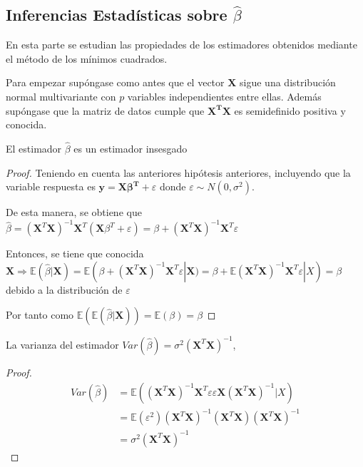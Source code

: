 \subsection*{Inferencias Estadísticas sobre $\hat{\beta}$}

\noindent En esta parte se estudian las propiedades de los estimadores obtenidos mediante el método de los mínimos cuadrados. 

\noindent Para empezar supóngase como antes que el vector $\mathbf{X}$ sigue una distribución normal multivariante con $p$ variables independientes entre ellas. Además supóngase que  la matriz de datos cumple que $\mathbf{X^T X}$ es semidefinido positiva y conocida. 

\begin{propo}
El estimador $\hat{\beta}$ es un estimador insesgado \cite{Greene 2008}
\begin{proof}
Teniendo en cuenta las anteriores hipótesis anteriores, incluyendo que la variable respuesta es $\mathbf{y}=\mathbf{X\beta^T}+\varepsilon$ donde $\varepsilon \sim N(0,\sigma^2)$. 

\noindent De esta manera, se obtiene que $\hat{\beta}=(\mathbf{X}^T\mathbf{X})^{-1}\mathbf{X}^T(\mathbf{X}\beta^T+\varepsilon)=\beta+(\mathbf{X}^T\mathbf{X})^{-1}\mathbf{X}^T \varepsilon$

\noindent Entonces, se tiene que conocida $\mathbf{X} \Rightarrow \mathbb{E}(\hat{\beta}|\mathbf{X})=\mathbb{E}(\beta+(\mathbf{X}^T\mathbf{X})^{-1}\mathbf{X}^T \varepsilon|\mathbf{X})=\beta +\mathbb{E}(\mathbf{X}^T\mathbf{X})^{-1}\mathbf{X}^T \varepsilon|X)=\beta$ debido a la distribución de $\varepsilon$

\noindent Por tanto como $\mathbb{E}(\mathbb{E}(\hat{\beta}|\mathbf{X}))=\mathbb{E}(\beta)=\beta$
\end{proof}
\end{propo}

\begin{propo}
La varianza del estimador $Var(\hat{\beta})= \sigma^2 (\mathbf{X}^T \mathbf{X})^{-1}$\cite{Hastie 2001},\cite{Greene 2008}
\begin{proof}
\begin{equation}
\begin{split}
Var(\hat{\beta})&=\mathbb{E}((\mathbf{X}^T \mathbf{X})^{-1}\mathbf{X}^T \varepsilon \varepsilon\mathbf{X}(\mathbf{X}^T \mathbf{X})^{-1}|X)\\
&=\mathbb{E}(\varepsilon^2) (\mathbf{X}^T \mathbf{X})^{-1}(\mathbf{X}^T \mathbf{X})(\mathbf{X}^T \mathbf{X})^{-1} \\
&=\sigma^2 (\mathbf{X}^T \mathbf{X})^{-1}
\end{split}
\end{equation}
\end{proof}
\end{propo}

